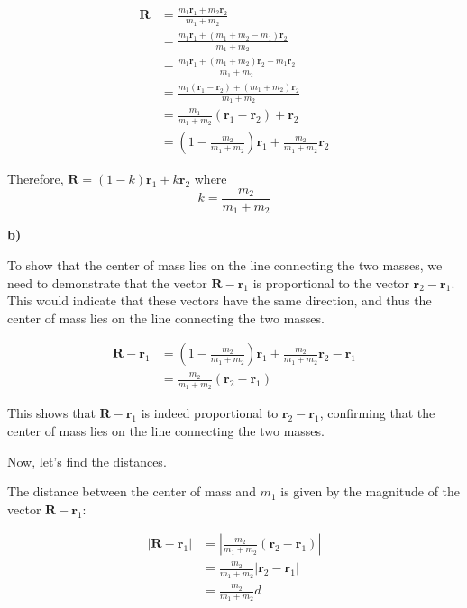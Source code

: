 \documentclass{article}
\begin{document}
\begin{align*}
\mathbf{R} &= \frac{m_1 \mathbf{r}_1 + m_2 \mathbf{r}_2}{m_1 + m_2} \\
&= \frac{m_1 \mathbf{r}_1 + (m_1 + m_2 - m_1)\mathbf{r}_2}{m_1 + m_2} \\
&= \frac{m_1 \mathbf{r}_1 + (m_1 + m_2)\mathbf{r}_2 - m_1\mathbf{r}_2}{m_1 + m_2} \\
&= \frac{m_1(\mathbf{r}_1 - \mathbf{r}_2) + (m_1 + m_2)\mathbf{r}_2}{m_1 + m_2} \\
&= \frac{m_1}{m_1 + m_2}(\mathbf{r}_1 - \mathbf{r}_2) + \mathbf{r}_2 \\
&= \left( 1 - \frac{m_2}{m_1 + m_2} \right) \mathbf{r}_1 + \frac{m_2}{m_1 + m_2} \mathbf{r}_2
\end{align*}

Therefore,  $\mathbf{R} = (1 - k)\mathbf{r}_1 + k\mathbf{r}_2$ where 
\begin{equation*}
k = \frac{m_2}{m_1 + m_2}
\end{equation*}

\textbf{b)}

To show that the center of mass lies on the line connecting the two masses, we need to demonstrate that the vector $\mathbf{R} - \mathbf{r}_1$ is proportional to the vector $\mathbf{r}_2 - \mathbf{r}_1$. This would indicate that these vectors have the same direction, and thus the center of mass lies on the line connecting the two masses.

\begin{align*}
\mathbf{R} - \mathbf{r}_1 &= \left( 1 - \frac{m_2}{m_1 + m_2} \right) \mathbf{r}_1 + \frac{m_2}{m_1 + m_2} \mathbf{r}_2 - \mathbf{r}_1 \\
&= \frac{m_2}{m_1 + m_2} (\mathbf{r}_2 - \mathbf{r}_1)
\end{align*}

This shows that $\mathbf{R} - \mathbf{r}_1$ is indeed proportional to $\mathbf{r}_2 - \mathbf{r}_1$, confirming that the center of mass lies on the line connecting the two masses.

Now, let's find the distances.

The distance between the center of mass and $m_1$ is given by the magnitude of the vector $\mathbf{R} - \mathbf{r}_1$:

\begin{align*}
|\mathbf{R} - \mathbf{r}_1| &= \left| \frac{m_2}{m_1 + m_2} (\mathbf{r}_2 - \mathbf{r}_1) \right| \\
&= \frac{m_2}{m_1 + m_2} |\mathbf{r}_2 - \mathbf{r}_1| \\
&= \frac{m_2}{m_1 + m_2} d 
\end{align*}
\end{document}

